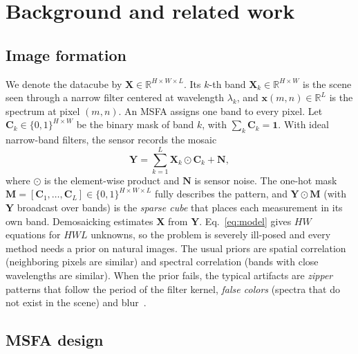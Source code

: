 \documentclass{article}
\def\X{{\mathbf X}}
\def\Y{{\mathbf Y}}
\def\C{{\mathbf C}}
\def\M{{\mathbf M}}
\def\N{{\mathbf N}}
\def\x{{\mathbf x}}
\begin{document}
\section{Background and related work}
\label{sec:background}

\subsection{Image formation}

We denote the datacube by $\X\in\mathbb{R}^{H\times W\times L}$. Its $k$-th
band $\X_k\in\mathbb{R}^{H\times W}$ is the scene seen through a narrow
filter centered at wavelength $\lambda_k$, and $\x(m,n)\in\mathbb{R}^L$ is
the spectrum at pixel $(m,n)$. An MSFA assigns one band to every pixel. Let
$\C_k\in\{0,1\}^{H\times W}$ be the binary mask of band $k$, with
$\sum_k\C_k=\mathbf{1}$. With ideal narrow-band filters, the sensor records
the mosaic~\cite{diaz2023}
\begin{equation}
  \Y = \sum_{k=1}^{L} \X_k \odot \C_k + \N,
  \label{eq:model}
\end{equation}
where $\odot$ is the element-wise product and $\N$ is sensor noise. The
one-hot mask $\M=[\C_1,\dots,\C_L]\in\{0,1\}^{H\times W\times L}$ fully
describes the pattern, and $\Y\odot\M$ (with $\Y$ broadcast over bands) is the
\emph{sparse cube} that places each measurement in its own band.
Demosaicking estimates $\X$ from $\Y$. Eq.~\eqref{eq:model} gives $HW$
equations for $HWL$ unknowns, so the problem is severely ill-posed and every
method needs a prior on natural images. The usual priors are spatial
correlation (neighboring pixels are similar) and spectral correlation (bands
with close wavelengths are similar). When the prior fails, the typical
artifacts are \emph{zipper} patterns that follow the period of the filter
kernel, \emph{false colors} (spectra that do not exist in the scene) and
blur~\cite{diaz2023}.

\subsection{MSFA design}
\end{document}
